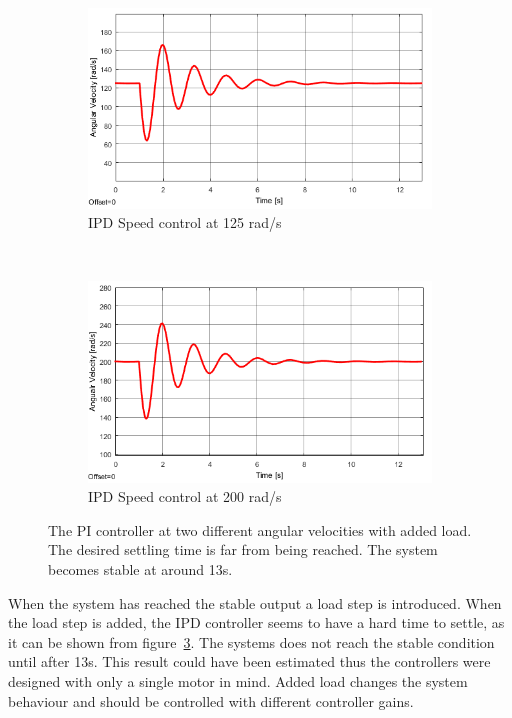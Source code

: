 \begin{figure}[h!]
	\centering
	\begin{subfigure}[b]{0.45\textwidth}
		\includegraphics[width=\textwidth]{graphics/IPD_load125}
		\caption{IPD Speed control at 125 rad/s}
		\label{fig:ipdload125}
	\end{subfigure}
	~ %
	\begin{subfigure}[b]{0.45\textwidth}
		\includegraphics[width=\textwidth]{graphics/IPD_load200}
		\caption{IPD Speed control at 200 rad/s}
		\label{fig:ipdload200}
	\end{subfigure}
	\caption{The PI controller at two different angular velocities with added load. The desired settling time is far from being reached. The system becomes stable at around 13s.}
	\label{fig:ipdload}
\end{figure}

When the system has reached the stable output a load step is introduced.
When the load step is added, the IPD controller seems to have a hard time to settle, as it can be shown from figure~\ref{fig:ipdload}. The systems does not reach the stable condition until after 13s. This result could have been estimated thus the controllers were designed with only a single motor in mind. Added load changes the system behaviour and should be controlled with different controller gains.
